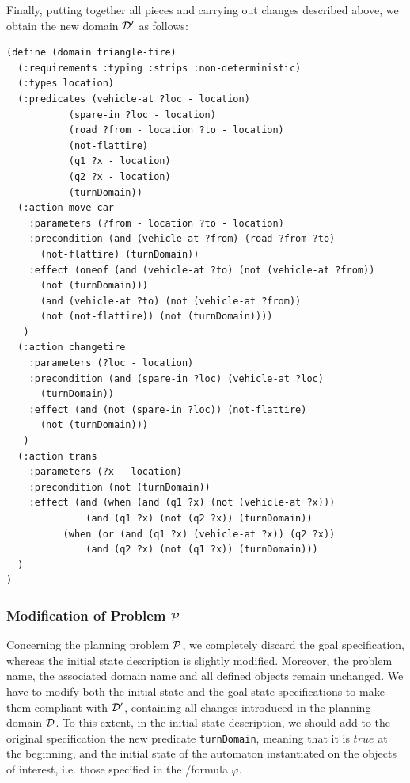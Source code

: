 \begin{example}
Finally, putting together all pieces and carrying out changes described above, we obtain the new domain $\D'$ as follows:

\begin{lstlisting}[language=PDDL, escapechar=£]
(define (domain triangle-tire)
  (:requirements :typing :strips :non-deterministic)
  (:types location)
  (:predicates (vehicle-at ?loc - location)
	       (spare-in ?loc - location)
	       (road ?from - location ?to - location)
	       (not-flattire)
	       (q1 ?x - location)
	       (q2 ?x - location)
	       (turnDomain))
  (:action move-car
    :parameters (?from - location ?to - location)
    :precondition (and (vehicle-at ?from) (road ?from ?to) 
      (not-flattire) (turnDomain))
    :effect (oneof (and (vehicle-at ?to) (not (vehicle-at ?from))
      (not (turnDomain)))
	  (and (vehicle-at ?to) (not (vehicle-at ?from)) 
	  (not (not-flattire)) (not (turnDomain))))
   )
  (:action changetire
    :parameters (?loc - location)
    :precondition (and (spare-in ?loc) (vehicle-at ?loc) 
      (turnDomain))
    :effect (and (not (spare-in ?loc)) (not-flattire)
      (not (turnDomain)))
   )
  (:action trans
    :parameters (?x - location)
    :precondition (not (turnDomain))
    :effect (and (when (and (q1 ?x) (not (vehicle-at ?x)))
              (and (q1 ?x) (not (q2 ?x)) (turnDomain))
          (when (or (and (q1 ?x) (vehicle-at ?x)) (q2 ?x))
              (and (q2 ?x) (not (q1 ?x)) (turnDomain)))
  )   
)
\end{lstlisting}
\end{example}

\subsubsection*{Modification of Problem $\P$}
Concerning the planning problem $\P$, we completely discard the goal specification, whereas the initial state description is slightly modified. Moreover, the problem name, the associated domain name and all defined objects remain unchanged. We have to modify both the initial state and the goal state specifications to make them compliant with $\D'$, containing all changes introduced in the planning domain $\D$. To this extent, in the initial state description, we should add to the original specification the new predicate \texttt{turnDomain}, meaning that it is $true$ at the beginning, and the initial state of the automaton instantiated on the objects of interest, i.e. those specified in the \LTLf/\PLTL formula $\varphi$. 

